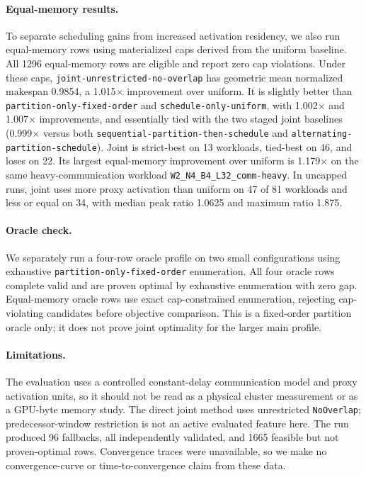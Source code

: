 \documentclass[10pt,twocolumn]{article}
\newcommand{\pof}{\texttt{partition-\allowbreak{}only-\allowbreak{}fixed-\allowbreak{}order}}
\newcommand{\sou}{\texttt{schedule-\allowbreak{}only-\allowbreak{}uniform}}
\newcommand{\seq}{\texttt{sequential-\allowbreak{}partition-\allowbreak{}then-\allowbreak{}schedule}}
\newcommand{\alt}{\texttt{alternating-\allowbreak{}partition-\allowbreak{}schedule}}
\newcommand{\joint}{\texttt{joint-\allowbreak{}unrestricted-\allowbreak{}no-\allowbreak{}overlap}}
\newcommand{\noop}{\texttt{NoOverlap}}
\newcommand{\heavycase}{\texttt{W2\_\allowbreak{}N4\_\allowbreak{}B4\_\allowbreak{}L32\_\allowbreak{}comm-\allowbreak{}heavy}}
\begin{document}
\paragraph{Equal-memory results.}
To separate scheduling gains from increased activation residency, we also run
equal-memory rows using materialized caps derived from the uniform baseline.
All 1296 equal-memory rows are eligible and report zero cap violations.  Under
these caps, \joint{} has geometric mean normalized
makespan 0.9854, a 1.015$\times$ improvement over uniform.  It is slightly
better than \pof{} and
\sou{}, with 1.002$\times$ and 1.007$\times$
improvements, and essentially tied with the two staged joint baselines
(0.999$\times$ versus both \seq{} and
\alt{}).  Joint is strict-best on 13 workloads,
tied-best on 46, and loses on 22.  Its largest equal-memory improvement over
uniform is 1.179$\times$ on the same heavy-communication workload
\heavycase{}.  In uncapped runs, joint uses more proxy
activation than uniform on 47 of 81 workloads and less or equal on 34, with
median peak ratio 1.0625 and maximum ratio 1.875.

\begin{table}[t]
  \centering
  \caption{Main-profile validation and activation summary.}
  \label{tab:cal-main-summary}
  \small
  
\end{table}

\paragraph{Oracle check.}
We separately run a four-row oracle profile on two small configurations using
exhaustive \pof{} enumeration.  All four oracle
rows complete valid and are proven optimal by exhaustive enumeration with zero
gap.  Equal-memory oracle rows use exact cap-constrained enumeration, rejecting
cap-violating candidates before objective comparison.  This is a fixed-order
partition oracle only; it does not prove joint optimality for the larger main
profile.

\begin{table}[t]
  \centering
  \caption{Oracle-profile validation and proof summary.}
  \label{tab:cal-oracle-summary}
  \small
  
\end{table}

\paragraph{Limitations.}
The evaluation uses a controlled constant-delay communication model and proxy
activation units, so it should not be read as a physical cluster measurement or
as a GPU-byte memory study.  The direct joint method uses unrestricted
\noop{}; predecessor-window restriction is not an active evaluated
feature here.  The run produced 96 fallbacks, all independently validated, and
1665 feasible but not proven-optimal rows.  Convergence traces were unavailable,
so we make no convergence-curve or time-to-convergence claim from these data.
\end{document}
